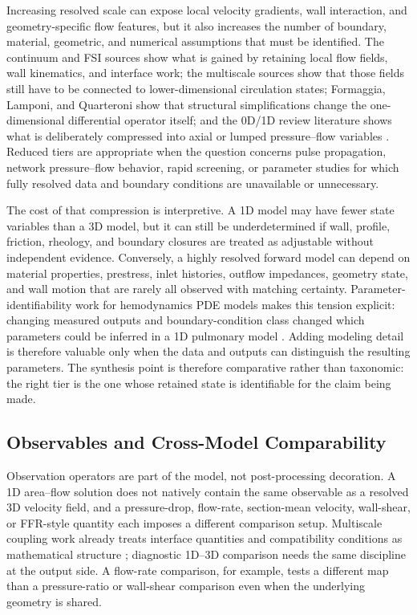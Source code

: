 Increasing resolved scale can expose local velocity gradients, wall
interaction, and geometry-specific flow features, but it also increases the
number of boundary, material, geometric, and numerical assumptions that must be
identified. The continuum and FSI sources show what is gained by retaining
local flow fields, wall kinematics, and interface work; the multiscale sources
show that those fields still have to be connected to lower-dimensional
circulation states; Formaggia, Lamponi, and Quarteroni show that structural
simplifications change the one-dimensional differential operator itself; and
the 0D/1D review literature shows what is deliberately compressed into axial
or lumped pressure--flow variables
\cite{FormaggiaEtAl2003OneDimensionalBloodFlow,FormaggiaEtAl2007FSICoupling,QuarteroniVeneziani2003GeometricalMultiscale,ShiEtAl2011BloodFlowModelReview}.
Reduced tiers are appropriate when the question concerns pulse propagation,
network pressure--flow behavior, rapid screening, or parameter studies for which
fully resolved data and boundary conditions are unavailable or unnecessary.

The cost of that compression is interpretive. A 1D model may have fewer state
variables than a 3D model, but it can still be underdetermined if wall, profile,
friction, rheology, and boundary closures are treated as adjustable without
independent evidence. Conversely, a highly resolved forward model can depend on
material properties, prestress, inlet histories, outflow impedances, geometry
state, and wall motion that are rarely all observed with matching certainty.
Parameter-identifiability work for hemodynamics PDE models makes this tension
explicit: changing measured outputs and boundary-condition class changed which
parameters could be inferred in a 1D pulmonary model
\cite{Colebank2025HemodynamicsIdentifiability}. Adding modeling detail is
therefore valuable only when the data and outputs can distinguish the resulting
parameters.
The synthesis point is therefore comparative rather than taxonomic: the right
tier is the one whose retained state is identifiable for the claim being made.

\subsection{Observables and Cross-Model Comparability}
\label{subsec:synthesis-observables-comparability}

Observation operators are part of the model, not post-processing decoration. A
1D area--flow solution does not natively contain the same observable as a
resolved 3D velocity field, and a pressure-drop, flow-rate, section-mean
velocity, wall-shear, or FFR-style quantity each imposes a different comparison
setup. Multiscale coupling work already treats interface quantities and
compatibility conditions as mathematical structure
\cite{FormaggiaEtAl2007FSICoupling,QuarteroniVeneziani2003GeometricalMultiscale};
diagnostic 1D--3D comparison needs the same discipline at the output side. A
flow-rate comparison, for example, tests a different map than a pressure-ratio
or wall-shear comparison even when the underlying geometry is shared.

